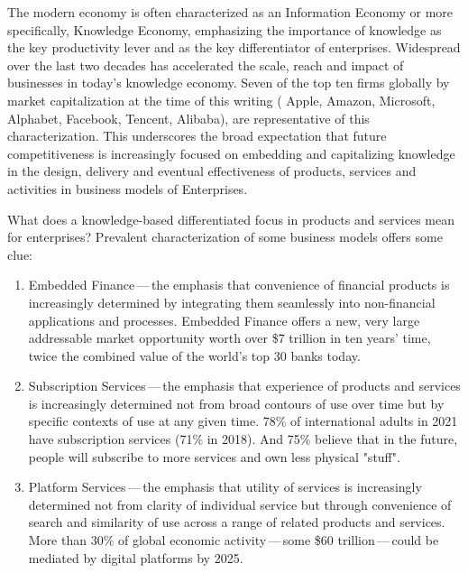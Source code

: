 
The modern economy is often characterized as an Information Economy or more specifically,
Knowledge Economy,
emphasizing the importance of knowledge as the key productivity lever and  as the
key differentiator of enterprises.
Widespread  over the last two decades has accelerated the scale, reach and impact of
businesses in today’s knowledge economy.
Seven of the top ten firms globally by market capitalization at the time of this writing (
Apple,
Amazon,
Microsoft,
Alphabet,
Facebook,
Tencent,
Alibaba),
are representative of this characterization.
This underscores the broad expectation that future competitiveness is increasingly focused on embedding and
capitalizing knowledge in the design, delivery and eventual effectiveness of products, services and activities
in business models of Enterprises.

What does a knowledge-based differentiated focus in products and services mean for enterprises?
Prevalent characterization of some business models offers some clue:
\begin{enumerate}[label=(\alph*)]

    \item Embedded Finance\,---\,the emphasis that convenience of financial products is increasingly determined by
          integrating them seamlessly into non-financial applications and processes.
          Embedded Finance offers a new, very large addressable market opportunity worth over \$7 trillion in
          ten years' time, twice the combined value of the world’s top 30 banks today.\autocite{embeddedfinance}

    \item Subscription Services\,---\,the emphasis that experience of products and services is increasingly determined
          not from broad contours of use over time but by specific contexts of use at any given time.
          78\% of international adults in 2021 have subscription services (71\% in 2018).
          And 75\% believe that in the future, people will subscribe to more services and own less physical "stuff".
          \autocite{subscriptioneconomy}

    \item Platform Services\,---\,the emphasis that utility of services is increasingly determined not from clarity of
          individual service but through convenience of search and similarity of use
          across a range of related products and services.
          More than 30\% of global economic activity\,---\,some \$60 trillion\,---\,could be mediated by
          digital platforms by 2025.\autocite{ifyourenotbuilding}

\end{enumerate}

